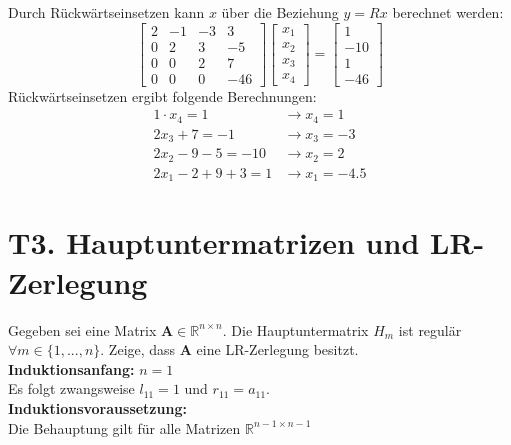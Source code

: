 \documentclass[11pt]{article}
\theoremstyle{plain}
\theoremstyle{definition}
\let\mbb\boldsymbol
\renewcommand\boldsymbol{\mbb}
\renewcommand{\a}{\"{a}}
\renewcommand{\u}{\"{u}}
\begin{document}
\begin{itemize}
Durch R\u ckw\a rtseinsetzen kann $x$ \u ber die Beziehung $y=Rx$ berechnet werden:
\begin{equation}
\begin{bmatrix}
2 & -1 & -3 & 3 \\
0 & 2 & 3 & -5 \\
0 & 0 & 2 & 7 \\
0 & 0 & 0 & -46
\end{bmatrix}
\begin{bmatrix}
x_1 \\ x_2 \\ x_3 \\ x_4
\end{bmatrix}
=
\begin{bmatrix}
1 \\ -10 \\ 1 \\ -46
\end{bmatrix}
\end{equation}
R\u ckw\a rtseinsetzen ergibt folgende Berechnungen:
\begin{align}
1 \cdot x_4 = 1   &\rightarrow x_4 = 1 \\
2x_3 + 7 = -1      &\rightarrow x_3=-3 \\
2x_2-9-5 =-10     &\rightarrow x_2 = 2 \\
2x_1 -2 + 9 +3 = 1 &\rightarrow x_1 = -4.5
\end{align} 
\end{itemize}

\section*{T3. Hauptuntermatrizen und LR-Zerlegung}
Gegeben sei eine Matrix $\mbb{A}\in \mathbb{R}^{n \times n}$. Die Hauptuntermatrix $H_m$ ist regul\a r $\forall m \in \{1,...,n\}$. Zeige, dass $\mbb{A}$ eine LR-Zerlegung besitzt.\\

\textbf{Induktionsanfang:} $n = 1$ \\
Es folgt zwangsweise $l_{11} = 1$ und $r_{11} = a_{11}$.\\

\textbf{Induktionsvoraussetzung:} \\
Die Behauptung gilt f\u r alle Matrizen $\mathbb{R}^{n-1 \times n-1}$\\
\end{document}
